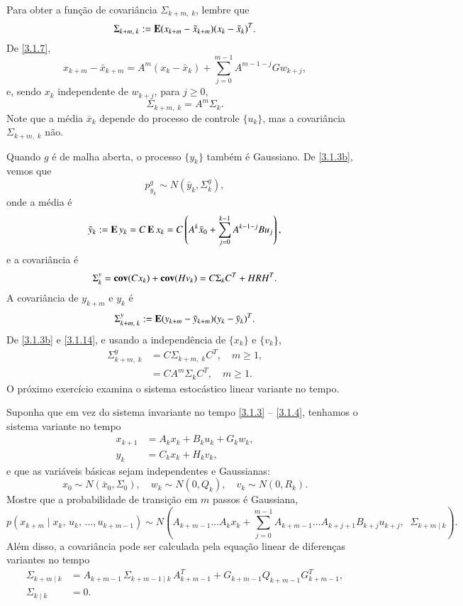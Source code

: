 Para obter a função de covariância $\Sigma_{k+m,\;k}$, lembre que
\[
	\Sigma_{k+m,\;k}:=\operatorname{\bf E}(x_{k+m}
	-\bar x_{k+m})(x_k-\bar x_k)^T.
\]
De \eqref{3.1.7},
\[
	x_{k+m}-\bar x_{k+m}=A^m(x_{k}
	-\bar x_{k})+\sum_{j=0}^{m-1}
	A^{m-1-j}Gw_{k+j},
\]
e, sendo $x_k$ independente de $w_{k+j}$, para $j\ge0$,
\begin{equation}\label{3.1.14}
	\Sigma_{k+m,\;k}=A^m\Sigma_{k}.
\end{equation}
Note que a média $\bar x_k$ depende do processo de controle $\{u_k\}$, mas a covariância $\Sigma_{k+m,\;k}$ não.

Quando $g$ é de malha aberta, o processo $\{y_k\}$ também é Gaussiano. De \eqref{3.1.3b}, vemos que
\[
	p^g_{y_k} \sim N(\bar y_k, \Sigma^y_k),
\]
onde a média é
\[
	\bar y_k:=\operatorname{\bf E} y_k=C\operatorname{\bf E} x_k
	=C\left(A^k\bar x_0+
	\sum_{j=0}^{k-1}A^{k-1-j}Bu_{j}\right),
\]
e a covariância é
\begin{equation}\label{3.1.15}
	\Sigma^y_k=\operatorname{\bf cov}(Cx_k)+\operatorname{\bf cov}(Hv_k)
	=C\Sigma_k C^T+HRH^T.
\end{equation}
A covariância de $y_{k+m}$ e $y_k$ é
\[
	\Sigma^y_{k+m,\;k}:=\operatorname{\bf E} (y_{k+m}
	-\bar y_{k+m})(y_k-\bar y_k)^T.
\]
De \eqref{3.1.3b} e \eqref{3.1.14}, e usando a independência de $\{x_k\}$ e $\{v_k\}$,
\begin{align}
	\Sigma^y_{k+m,\;k} &= C\Sigma_{k+m,\;k}
	C^T,\quad m\ge 1,
	\nonumber\\
	&=CA^m\Sigma_{k}C^T,\quad m\ge 1.
\end{align}
O próximo exercício examina o sistema estocástico linear variante no tempo.
\begin{Exercicio}\label{3.1.17}
Suponha que em vez do sistema invariante no tempo \eqref{3.1.3} -- \eqref{3.1.4}, tenhamos o sistema variante no tempo
\begin{align*}
	x_{k+1} &=A_k x_k+ B_k u_k+ G_k w_k,\\
	y_k &= C_k x_k + H_k v_k,
\end{align*}
e que as variáveis básicas sejam independentes e Gaussianas:
\[
	x_0 \sim N(\bar x_0, \Sigma_0), \quad
	w_k \sim N(0,Q_k), \quad
	v_k \sim N(0,R_k).
\]
Mostre que a probabilidade de transição em $m$ passos é Gaussiana,
\[
	p(x_{k+m}\;|\;x_k,\,u_k,\,\dots,u_{k+m-1})
	\sim N\left(A_{k+m-1}\dots A_kx_k+
	\sum_{j=0}^{m-1}A_{k+m-1}\dots A_{k+j+1}
	B_{k+j}u_{k+j},\;\; \Sigma_{k+m\;|\;k}
	\right).
\]
Além disso, a covariância pode ser calculada pela equação linear de diferenças variantes no tempo
\begin{align*}
	\Sigma_{k+m\;|\;k} &=
	A_{k+m-1}\,\Sigma_{k+m-1\;|\;k}\,A_{k+m-1}^T
	+G_{k+m-1}Q_{k+m-1}G_{k+m-1}^T,\\
	\Sigma_{k\;|\;k} &= 0.
\end{align*}
\end{Exercicio}

